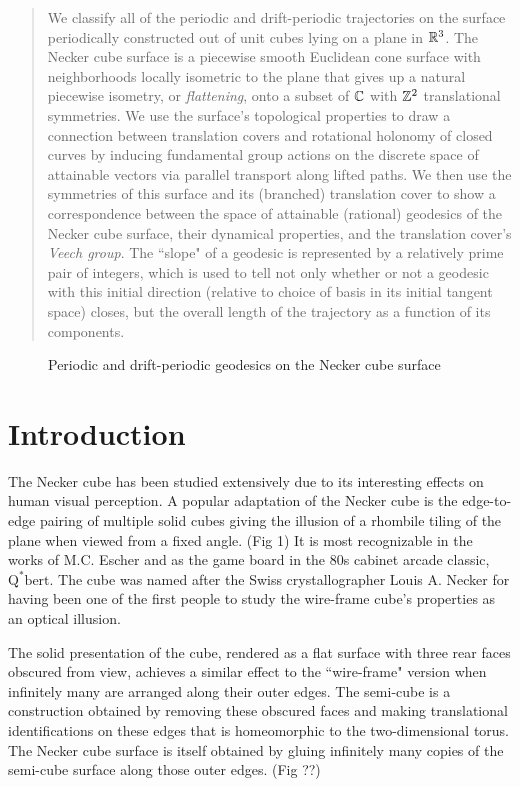 \documentclass[a4paper, 11pt]{article}
\begin{document}
\begin{abstract}
\noindent We classify all of the periodic and drift-periodic trajectories on the surface periodically constructed out of unit cubes lying on a plane in $\mathbb{R}^3$. The Necker cube surface is a piecewise smooth Euclidean cone surface with neighborhoods locally isometric to the plane that gives up a natural piecewise isometry, or \emph{flattening}, onto a subset of $\mathbb{C}$ with $\mathbb{Z}^2$ translational symmetries. We use the surface's topological properties to draw a connection between translation covers and rotational holonomy of closed curves by inducing fundamental group actions on the discrete space of attainable vectors via parallel transport along lifted paths. We then use the symmetries of this surface and its (branched) translation cover to show a correspondence between the space of attainable (rational) geodesics of the Necker cube surface, their dynamical properties, and the translation cover's \emph{Veech group}. The ``slope" of a geodesic is represented by a relatively prime pair of integers, which is used to tell not only whether or not a geodesic with this initial direction (relative to choice of basis in its initial tangent space) closes, but the overall length of the trajectory as a function of its components.
\end{abstract}
\begin{figure}[H]
\centering

\label{fig:front}
\caption{Periodic and drift-periodic geodesics on the Necker cube surface}
\end{figure}
\newpage
\section{Introduction}
The Necker cube has been studied extensively due to its interesting effects on human visual perception. \cite{Albert} A popular adaptation of the Necker cube is the edge-to-edge pairing of multiple solid cubes giving the illusion of a rhombile tiling of the plane when viewed from a fixed angle. (Fig 1) It is most recognizable in the works of M.C. Escher \cite{Escher1}\cite{Escher2} and as the game board in the 80s cabinet arcade classic, $\text{Q}^*\text{bert}$.\cite{Qbert} The cube was named after the Swiss crystallographer Louis A. Necker for having been one of the first people to study the wire-frame cube's properties as an optical illusion. 

 The solid presentation of the cube, rendered as a flat surface with three rear faces obscured from view, achieves a similar effect to the ``wire-frame" version when infinitely many are arranged along their outer edges. The semi-cube is a construction obtained by removing these obscured faces and making translational identifications on these edges that is homeomorphic to the two-dimensional torus. The Necker cube surface is itself obtained by gluing infinitely many copies of the semi-cube surface along those outer edges. (Fig ??)
\end{document}
